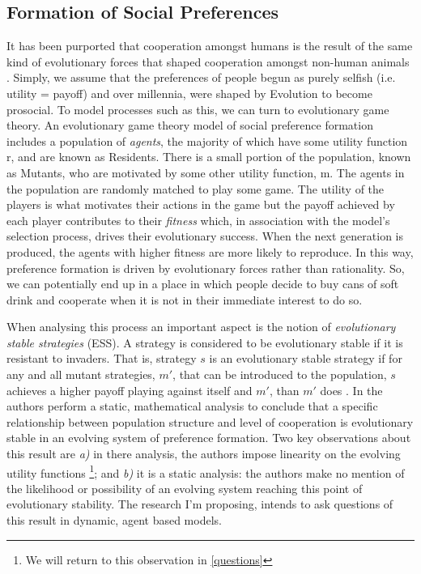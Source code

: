 \documentclass[11pt]{article}
\newcommand*{\np}{\par\noindent\newline}
\begin{document}
\subsection{Formation of Social Preferences}\label{formation_social_preferences}
It has been purported that cooperation amongst humans is the result of the same
kind of evolutionary forces that shaped cooperation amongst non-human animals
\cite{silk_evolution_2016}. Simply, we assume that the preferences of
people begun as purely selfish (i.e. utility = payoff) and over millennia, were
shaped by Evolution to become prosocial. To model processes such as this, we
can turn to evolutionary game theory. An evolutionary game theory model of
social preference formation includes a population of \textit{agents}, the
majority of which have some utility function r, and are known as Residents.
There is a small portion of the population, known as Mutants, who are
motivated by some other utility function, m. The agents in the population are
randomly matched to play some game. The utility of the players is
what motivates their actions in the game but the payoff achieved by each
player contributes to their \textit{fitness} which, in association with the
model's selection process, drives their evolutionary success. When the next
generation is produced, the agents with higher fitness are more likely to
reproduce. In this way, preference formation is driven by evolutionary
forces rather than rationality. So, we can potentially end up in a place in
which people decide to buy cans of soft drink and cooperate when it is not in
their immediate interest to do so.

\np When analysing this process an important aspect is the notion of
\textit{evolutionary stable strategies} (ESS). A strategy is considered to be
evolutionary stable if it is resistant to invaders. That is, strategy $s$ is an
evolutionary stable strategy if for any and all mutant strategies, $m'$, that
can be introduced to the population, $s$ achieves a higher payoff playing
against itself and $m'$, than $m'$ does \cite{shoham_multiagent_nodate}. In
\cite{alger_homo_2013} the authors perform a static, mathematical analysis to
conclude that a specific relationship between population structure and level of
cooperation is evolutionary stable in an evolving system of preference
formation. Two key observations about this result are \textit{a)} in there
analysis, the authors impose linearity on the evolving utility functions
\footnote{We will return to this observation in \ref{questions}}; and
\textit{b)} it is a static analysis: the authors make no mention of the
likelihood or possibility of an evolving system reaching this point of
evolutionary stability. The research I'm proposing, intends to ask questions of this result in dynamic, agent based models.
\end{document}
